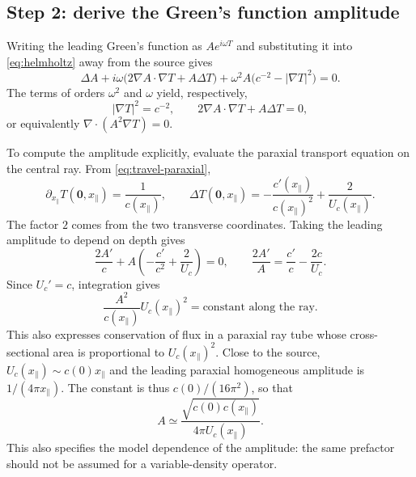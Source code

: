 \documentclass[11pt]{article}
\begin{document}
\subsection{Step 2: derive the Green's function amplitude}

Writing the leading Green's function as $A e^{i\omega T}$ and
substituting it into \eqref{eq:helmholtz} away from the source gives
\begin{equation}
\Delta A+i\omega\big(2\nabla A\cdot\nabla T+A\Delta T\big)
+\omega^2 A\big(c^{-2}-|\nabla T|^2\big)=0.
\end{equation}
The terms of orders $\omega^2$ and $\omega$ yield, respectively,
\begin{equation}
|\nabla T|^2=c^{-2},\qquad
2\nabla A\cdot\nabla T+A\Delta T=0,
\end{equation}
or equivalently $\nabla\cdot(A^2\nabla T)=0$.

To compute the amplitude explicitly, evaluate the paraxial transport
equation on the central ray. From \eqref{eq:travel-paraxial},
\begin{equation}
\partial_{x_\parallel}T(\mathbf0,x_\parallel)
=\frac{1}{c(x_\parallel)},\qquad
\Delta T(\mathbf0,x_\parallel)
=-\frac{c'(x_\parallel)}{c(x_\parallel)^2}
+\frac{2}{U_c(x_\parallel)}.
\end{equation}
The factor $2$ comes from the two transverse coordinates. Taking the
leading amplitude to depend on depth gives
\begin{equation}
\frac{2A'}{c}+A\left(-\frac{c'}{c^2}+\frac{2}{U_c}\right)=0,
\qquad
\frac{2A'}{A}=\frac{c'}{c}-\frac{2c}{U_c}.
\end{equation}
Since $U_c'=c$, integration gives
\begin{equation}
\frac{A^2}{c(x_\parallel)}U_c(x_\parallel)^2
=\text{constant along the ray}.
\end{equation}
This also expresses conservation of flux in a paraxial ray tube whose
cross-sectional area is proportional to $U_c(x_\parallel)^2$.
Close to the source, $U_c(x_\parallel)\sim c(0)x_\parallel$ and the
leading paraxial homogeneous amplitude is $1/(4\pi x_\parallel)$.
The constant is thus $c(0)/(16\pi^2)$, so that
\begin{equation}
A\simeq\frac{\sqrt{c(0)c(x_\parallel)}}{4\pi U_c(x_\parallel)}.
\label{eq:amplitude}
\end{equation}
This also specifies the model dependence of the amplitude: the same
prefactor should not be assumed for a variable-density operator.
\end{document}
